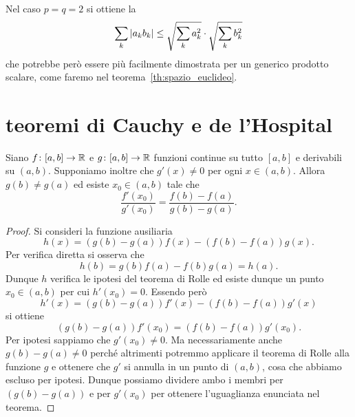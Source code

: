 Nel caso $p=q=2$ si ottiene la 
%
%
%
\[
   \sum_k {\left|a_k b_k\right|} \le \sqrt{\sum_k a_k^2} \cdot \sqrt{\sum_k b_k^2}
\]
che potrebbe però essere più facilmente dimostrata 
per un generico prodotto scalare, come faremo 
nel teorema~\ref{th:spazio_euclideo}.

\section{teoremi di Cauchy e de l'Hospital}

\begin{theorem}[Cauchy]
\label{th:cauchy}%
\mymark{**}%
%
%
Siano $f\colon[a,b]\to \mathbb R$ e $g\colon[a,b]\to \mathbb R$ funzioni continue su tutto $[a,b]$ e derivabili su $(a,b)$.
Supponiamo inoltre che $g'(x)\neq 0$ per ogni $x\in (a,b)$.
Allora $g(b) \neq g(a)$ ed esiste $x_0\in(a,b)$ tale che
\[
  \frac{f'(x_0)}{g'(x_0)} = \frac{f(b)-f(a)}{g(b)-g(a)}.
\]
\end{theorem}
%
\begin{proof}
\mymark{**}
Si consideri la funzione ausiliaria
\[
 h(x) = (g(b)-g(a))f(x) - (f(b)-f(a))g(x).
\]
Per verifica diretta si osserva che
\[
  h(b) = g(b)f(a) - f(b)g(a) = h(a).
\]
Dunque $h$ verifica le ipotesi del teorema di Rolle ed esiste
dunque un punto $x_0\in(a,b)$ per cui $h'(x_0) = 0$.
Essendo però
\[
  h'(x) = (g(b) - g(a)) f'(x) - (f(b)-f(a)) g'(x)
\]
si ottiene
\[
 (g(b)-g(a))f'(x_0) = (f(b) - f(a))g'(x_0).
\]
Per ipotesi sappiamo che $g'(x_0)\neq 0$.
Ma necessariamente anche $g(b) - g(a)\neq 0$ perché altrimenti potremmo applicare il teorema di Rolle alla funzione $g$ e ottenere che $g'$ si annulla in un punto di $(a,b)$, cosa che abbiamo escluso per ipotesi.
Dunque possiamo dividere ambo i membri per $(g(b)-g(a))$ e per $g'(x_0)$ per ottenere l'uguaglianza enunciata nel teorema.
\end{proof}

